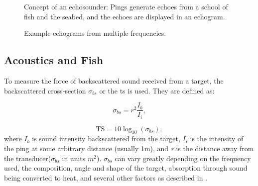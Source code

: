     
    \begin{figure}[H]
        \centering
            
        \caption[Echosounder]{Concept of an echosounder: Pings generate echoes from a school of fish and the seabed, and the echoes are displayed in an echogram.}
      	\medskip 
        \label{echogram}
    \end{figure}
    
    \begin{figure}[H]
        \centering
            
        \caption[Echosounder]{Example echograms from multiple frequencies.}
      	\medskip 
        \label{echogram_example_fig}
    \end{figure}

    
\subsection{Acoustics and Fish}
    To measure the force of backscattered sound received from a target, the backscattered cross-section $\sigma_{bs}$ or the \gls{ts} is used. They are defined as:
    
    
      \begin{equation}        
       \sigma_{bs} = r^{2}\frac{I_{b}}{I_{i}},
   \end{equation}
    

    \begin{equation}
        \textrm{TS} = 10 \log_{10}(\sigma_{bs}),
    \end{equation}
    where $I_{b}$ is sound intensity backscattered from the target, $I_{i}$ is the intensity of the ping at some arbitrary distance (usually 1m), and \textit{r} is the distance away from the transducer($\sigma_{bs}$ in units $m^{2}$). $\sigma_{bs}$ can vary greatly depending on the frequency used, the composition, angle and shape of the target, absorption through sound being converted to heat, and several other factors as described in \citet{simmonds2008fisheries}. 

